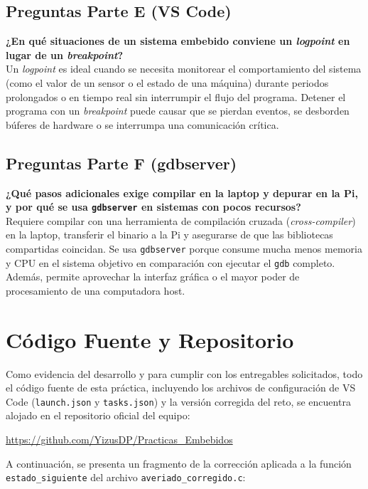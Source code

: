 \documentclass[conference]{IEEEtran}
\begin{document}
\subsection{Preguntas Parte E (VS Code)}
\textbf{¿En qué situaciones de un sistema embebido conviene un \textit{logpoint} en lugar de un \textit{breakpoint}?} \\
Un \textit{logpoint} es ideal cuando se necesita monitorear el comportamiento del sistema (como el valor de un sensor o el estado de una máquina) durante periodos prolongados o en tiempo real sin interrumpir el flujo del programa. Detener el programa con un \textit{breakpoint} puede causar que se pierdan eventos, se desborden búferes de hardware o se interrumpa una comunicación crítica.

\subsection{Preguntas Parte F (gdbserver)}
\textbf{¿Qué pasos adicionales exige compilar en la laptop y depurar en la Pi, y por qué se usa \texttt{gdbserver} en sistemas con pocos recursos?} \\
Requiere compilar con una herramienta de compilación cruzada (\textit{cross-compiler}) en la laptop, transferir el binario a la Pi y asegurarse de que las bibliotecas compartidas coincidan. Se usa \texttt{gdbserver} porque consume mucha menos memoria y CPU en el sistema objetivo en comparación con ejecutar el \texttt{gdb} completo. Además, permite aprovechar la interfaz gráfica o el mayor poder de procesamiento de una computadora host.

\section{Código Fuente y Repositorio}
Como evidencia del desarrollo y para cumplir con los entregables solicitados, todo el código fuente de esta práctica, incluyendo los archivos de configuración de VS Code (\texttt{launch.json} y \texttt{tasks.json}) y la versión corregida del reto, se encuentra alojado en el repositorio oficial del equipo:

\begin{center}
	\url{https://github.com/YizusDP/Practicas_Embebidos}
\end{center}

A continuación, se presenta un fragmento de la corrección aplicada a la función \texttt{estado\_siguiente} del archivo \texttt{averiado\_corregido.c}:
\end{document}
